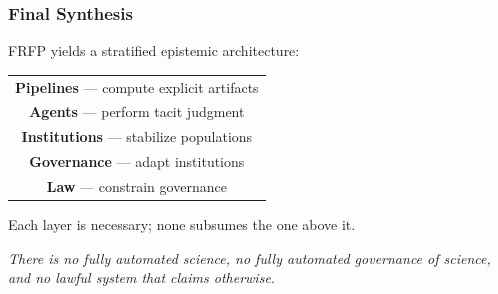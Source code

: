 \subsubsection{Final Synthesis}

FRFP yields a stratified epistemic architecture:

\begin{center}
\begin{tabular}{c}
\textbf{Pipelines} — compute explicit artifacts \\
\textbf{Agents} — perform tacit judgment \\
\textbf{Institutions} — stabilize populations \\
\textbf{Governance} — adapt institutions \\
\textbf{Law} — constrain governance
\end{tabular}
\end{center}

Each layer is necessary; none subsumes the one above it.

\medskip

\noindent
\emph{There is no fully automated science, no fully automated governance of
science, and no lawful system that claims otherwise.}

